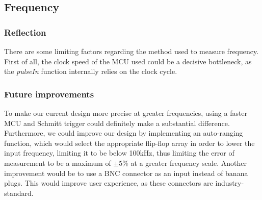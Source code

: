 \subsection{Frequency}
\label{sec:discussion_frequency}

\subsubsection{Reflection}
There are some limiting factors regarding the method used to measure frequency. First of all, the clock speed of the MCU used could be a decisive bottleneck, as the \textit{pulseIn} function internally relies on the clock cycle.

\subsubsection{Future improvements}
To make our current design more precise at greater frequencies, using a faster MCU and Schmitt trigger could definitely make a substantial difference. Furthermore, we could improve our design by implementing an auto-ranging function, which would select the appropriate flip-flop array in order to lower the input frequency, limiting it to be below 100kHz, thus limiting the error of measurement to be a maximum of $\pm$5\% at a greater frequency scale. Another improvement would be to use a BNC connector as an input instead of banana plugs. This would improve user experience, as these connectors are industry-standard.